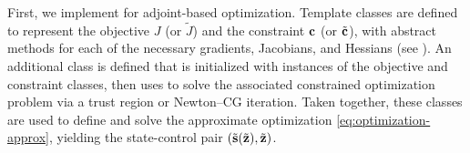 

First, we implement  for adjoint-based optimization.
Template classes are defined to represent the objective $J$ (or $\tilde{J}$) and the constraint $\mathbf{c}$ (or $\tilde{\mathbf{c}}$), with abstract methods for each of the necessary gradients, Jacobians, and Hessians (see ).
An additional class is defined that is initialized with instances of the objective and constraint classes, then uses  to solve the associated constrained optimization problem via a trust region or Newton--CG iteration.
Taken together, these classes are used to define and solve the approximate optimization \cref{eq:optimization-approx}, yielding the state-control pair $(\tilde{\mathbf{s}}(\tilde{\mathbf{z}}),\tilde{\mathbf{z}})$.

